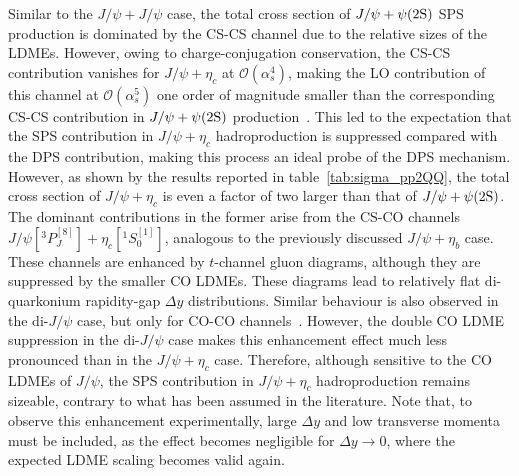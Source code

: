 Similar to the $J/\psi+J/\psi$ case, the total cross section of $J/\psi+\psi(2\mathrm{S})$ SPS production is dominated by the CS-CS channel due to the relative sizes of the LDMEs. However, owing to charge-conjugation conservation, the CS-CS contribution vanishes for $J/\psi+\eta_c$ at $\mathcal{O}(\alpha_s^4)$, making the LO contribution of this channel at $\mathcal{O}(\alpha_s^5)$ one order of magnitude smaller than the corresponding CS-CS contribution in $J/\psi+\psi(2\mathrm{S})$ production~\cite{Lansberg:2013qka}. This led to the expectation that the SPS contribution in $J/\psi+\eta_c$ hadroproduction is suppressed compared with the DPS contribution, making this process an ideal probe of the DPS mechanism. However, as shown by the results reported in table~\ref{tab:sigma_pp2QQ}, the total cross section of $J/\psi+\eta_c$ is even a factor of two larger than that of $J/\psi+\psi(2\mathrm{S})$. The dominant contributions in the former arise from the CS-CO channels $J/\psi[^3P_J^{[8]}]+\eta_c[^1S_0^{[1]}]$, analogous to the previously discussed $J/\psi+\eta_b$ case. These channels are enhanced by $t$-channel gluon diagrams, although they are suppressed by the smaller CO LDMEs. These diagrams lead to relatively flat di-quarkonium rapidity-gap $\Delta y$ distributions. Similar behaviour is also observed in the di-$J/\psi$ case, but only for CO-CO channels~\cite{Lansberg:2019fgm}. However, the double CO LDME suppression in the di-$J/\psi$ case makes this enhancement effect much less pronounced than in the $J/\psi+\eta_c$ case. Therefore, although sensitive to the CO LDMEs of $J/\psi$, the SPS contribution in $J/\psi+\eta_c$ hadroproduction remains sizeable, contrary to what has been assumed in the literature.
Note that, to observe this enhancement experimentally, large $\Delta y$ and low transverse momenta must be included, as the effect becomes negligible for $\Delta y \to 0$, where the expected LDME scaling becomes valid again.

